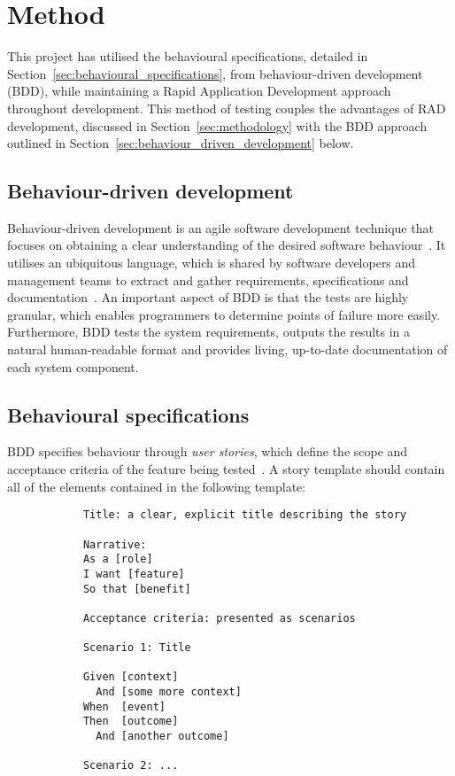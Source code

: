 \section{Method} {
\label{sec:testing_method}

	This project has utilised the behavioural specifications, detailed in Section~\ref{sec:behavioural_specifications}, from behaviour-driven development (BDD), while maintaining a Rapid Application Development approach throughout development. This method of testing couples the advantages of RAD development, discussed in Section~\ref{sec:methodology} with the BDD approach outlined in Section~\ref{sec:behaviour_driven_development} below.

	\subsection{Behaviour-driven development} {
	\label{sec:behaviour_driven_development}

		Behaviour-driven development is an agile software development technique that focuses on obtaining a clear understanding of the desired software behaviour~\parencite{rice2014bdd}. It utilises an ubiquitous language, which is shared by software developers and management teams to extract and gather requirements, specifications and documentation~\parencite{bellware2015bdd, evans2004domain}. An important aspect of BDD is that the tests are highly granular, which enables programmers to determine points of failure more easily. Furthermore, BDD tests the system requirements, outputs the results in a natural human-readable format and provides living, up-to-date documentation of each system component.

	}

	\subsection{Behavioural specifications} {
	\label{sec:behavioural_specifications}

		BDD specifies behaviour through \emph{user stories}, which define the scope and acceptance criteria of the feature being tested~\parencite{north2007story}. A story template should contain all of the elements contained in the following template:

		\begin{verbatim}
			Title: a clear, explicit title describing the story
 
			Narrative:
			As a [role]
			I want [feature]
			So that [benefit]
			 
			Acceptance criteria: presented as scenarios
			 
			Scenario 1: Title

			Given [context]
			  And [some more context]
			When  [event]
			Then  [outcome]
			  And [another outcome]

	  		Scenario 2: ...
		\end{verbatim}

	}

}


